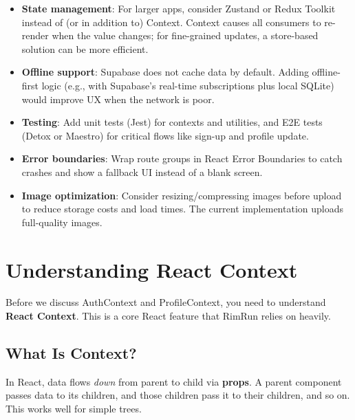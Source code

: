 \documentclass[11pt,a4paper]{article}
\begin{document}
\begin{itemize}[leftmargin=*]
    \item \textbf{State management}: For larger apps, consider Zustand or Redux Toolkit instead of (or in addition to) Context. Context causes all consumers to re-render when the value changes; for fine-grained updates, a store-based solution can be more efficient.
    
    \item \textbf{Offline support}: Supabase does not cache data by default. Adding offline-first logic (e.g., with Supabase's real-time subscriptions plus local SQLite) would improve UX when the network is poor.
    
    \item \textbf{Testing}: Add unit tests (Jest) for contexts and utilities, and E2E tests (Detox or Maestro) for critical flows like sign-up and profile update.
    
    \item \textbf{Error boundaries}: Wrap route groups in React Error Boundaries to catch crashes and show a fallback UI instead of a blank screen.
    
    \item \textbf{Image optimization}: Consider resizing/compressing images before upload to reduce storage costs and load times. The current implementation uploads full-quality images.
\end{itemize}

\section{Understanding React Context}

Before we discuss AuthContext and ProfileContext, you need to understand \textbf{React Context}. This is a core React feature that RimRun relies on heavily.

\subsection{What Is Context?}

In React, data flows \textit{down} from parent to child via \textbf{props}. A parent component passes data to its children, and those children pass it to their children, and so on. This works well for simple trees.
\end{document}
